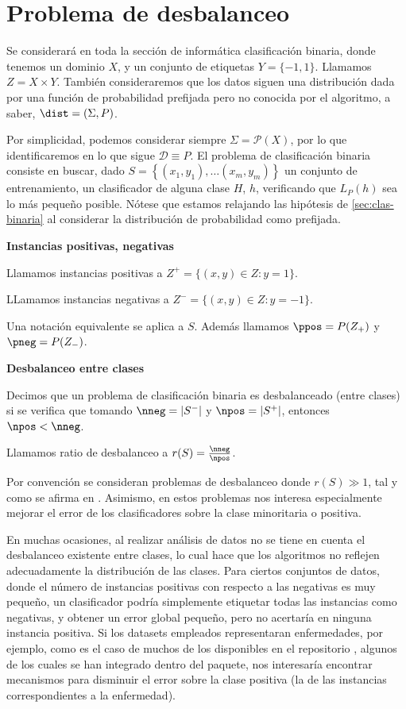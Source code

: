 \section{Problema de desbalanceo}
Se considerará en toda la sección de informática clasificación binaria, donde tenemos un dominio $X$, y un conjunto de etiquetas 
$Y=\{-1,1\}$. Llamamos $Z = X\times Y$. También consideraremos que los datos siguen una distribución dada por una función de 
probabilidad prefijada pero no conocida por el algoritmo, a saber, $\dist=(\Sigma, P)$. 

Por simplicidad, podemos considerar siempre $\Sigma = \mathcal{P}(X)$, por lo que identificaremos en lo que sigue $\mathcal{D} \equiv P$.
El problema de clasificación binaria consiste en buscar, dado $S= \left\{(x_1, y_1), \ldots (x_m, y_m)\right\}$ un 
conjunto de entrenamiento, un clasificador de alguna clase $H$, $h$, verificando que $L_{P}(h)$ sea lo más pequeño posible.
Nótese que estamos relajando las hipótesis de \ref{sec:clas-binaria} al considerar la distribución de probabilidad como prefijada.

\begin{definition} \textbf{Instancias positivas, negativas}

Llamamos instancias positivas a $Z^{+} = \{(x,y)\in Z: y=1\}$.

LLamamos instancias negativas a $Z^{-} = \{(x,y)\in Z: y=-1\}$.

Una notación equivalente se aplica a $S$. Además llamamos $\ppos = P(Z_{+})$ y $\pneg = P(Z_{-})$.
\end{definition}


\begin{definition} \textbf{Desbalanceo entre clases}

 Decimos que un problema de clasificación binaria es desbalanceado (entre clases) si se verifica que tomando 
 $\nneg = |S^{-}|$ y $\npos = |S^{+}|$, entonces $\npos < \nneg$.
 
 Llamamos ratio de desbalanceo a $r(S)=\frac{\nneg}{\npos}$.
\end{definition}

Por convención se consideran problemas de desbalanceo donde $r(S) \gg 1$, tal y como se afirma en \cite{he2009}. Asimismo,
en estos problemas nos interesa especialmente mejorar el error de los clasificadores sobre la clase minoritaria o positiva.

En muchas ocasiones, al realizar análisis de datos no se tiene en cuenta el desbalanceo existente entre clases, lo
cual hace que los algoritmos no reflejen adecuadamente la distribución de las clases. Para ciertos conjuntos de datos,
donde el número de instancias positivas con respecto a las negativas es muy pequeño, un clasificador podría simplemente
etiquetar todas las instancias como negativas, y obtener un error global pequeño, pero no acertaría en ninguna instancia
positiva. Si los datasets empleados representaran enfermedades, por ejemplo, como es el caso de muchos de los
disponibles en el repositorio , algunos de los cuales se han integrado dentro del paquete, 
nos interesaría encontrar mecanismos para disminuir el error sobre la clase positiva (la de las instancias correspondientes
a la enfermedad).

